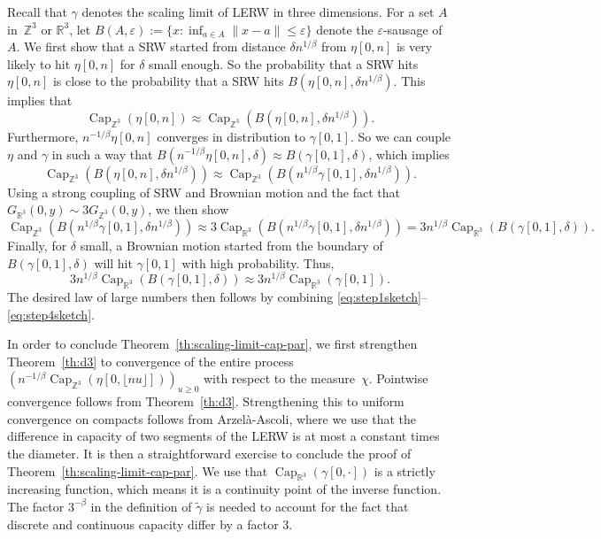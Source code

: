 \documentclass{article}
\DeclareMathOperator{\C}{Cap}
\DeclareMathOperator{\Ca}{Cap}
\newcommand{\R}{\mathbb{R}}
\newcommand{\Z}{\mathbb{Z}}
\newcommand{\1}{\mathbf{1}}
\newcommand{\Cz}{\C_{\Z^3}}
\newcommand{\Cr}{\C_{\R^3}}
\theoremstyle{definition}
\numberwithin{equation}{section}
\numberwithin{theorem}{section}
\begin{document}
Recall that $\gamma$ denotes the scaling limit of LERW in three dimensions. For a set $A$ in~$\Z^3$ or $\R^3$, let $B(A,\varepsilon):=\{x\colon\inf_{a\in A}\|x-a\|\leq\varepsilon\}$ denote the $\varepsilon$-sausage of $A$. We first show that a SRW started from distance $\delta n^{1/\beta}$ from $\eta[0,n]$ is very likely to hit $\eta[0,n]$ for $\delta$ small enough. So the probability that a SRW hits $\eta[0,n]$ is close to the probability that a SRW hits $B(\eta[0,n],\delta n^{1/\beta})$. This implies that 
\begin{equation}\label{eq:step1sketch}
	\Ca_{\Z^3}(\eta[0,n])\approx \Ca_{\Z^3}(B(\eta[0,n],\delta n^{1/\beta})).
\end{equation}
Furthermore, $n^{-1/\beta}\eta[0,n]$ converges in distribution to $\gamma[0,1]$. So we can couple $\eta$ and $\gamma$ in such a way that $B(n^{-1/\beta}\eta[0,n],\delta)\approx B(\gamma[0,1],\delta)$, which implies
\begin{equation}\label{eq:step2sketch}
	\Ca_{\Z^3}(B(\eta[0,n],\delta n^{1/\beta}))\approx\Ca_{\Z^3}(B(n^{1/\beta}\gamma[0,1],\delta n^{1/\beta})).
\end{equation}
Using a strong coupling of SRW and Brownian motion and the fact that $G_{\R^3}(0,y)\sim3G_{\Z^3}(0,y)$, we then show
\begin{equation}\label{eq:step3sketch}
	\Ca_{\Z^3}(B(n^{1/\beta}\gamma[0,1],\delta n^{1/\beta}))\approx3\Ca_{\R^3}(B(n^{1/\beta}\gamma[0,1],\delta n^{1/\beta}))=3n^{1/\beta}\Ca_{\R^3}(B(\gamma[0,1],\delta)).
\end{equation}
Finally, for $\delta$ small, a Brownian motion started from the boundary of $B(\gamma[0,1],\delta)$ will hit $\gamma[0,1]$ with high probability. Thus,
\begin{equation}\label{eq:step4sketch}
	3n^{1/\beta}\Ca_{\R^3}(B(\gamma[0,1],\delta))\approx3n^{1/\beta}\Ca_{\R^3}(\gamma[0,1]).
\end{equation}
The desired law of large numbers then follows by combining \eqref{eq:step1sketch}--\eqref{eq:step4sketch}.

In order to conclude Theorem~\ref{th:scaling-limit-cap-par}, we first strengthen Theorem~\ref{th:d3} to convergence of the entire process $(n^{-1/\beta}\Cz(\eta[0,\lfloor nu\rfloor]))_{u\geq0}$ with respect to the measure~$\chi$. Pointwise convergence follows from Theorem~\ref{th:d3}. Strengthening this to uniform convergence on compacts follows from Arzel\`a-Ascoli, where we use that the difference in capacity of two segments of the LERW is at most a constant times the diameter. It is then a straightforward exercise to conclude the proof of Theorem~\ref{th:scaling-limit-cap-par}. We use that $\Cr(\gamma[0,\cdot])$ is a strictly increasing function, which means it is a continuity point of the inverse function. The factor $3^{-\beta}$ in the definition of $\widetilde\gamma$ is needed to account for the fact that discrete and continuous capacity differ by a factor 3. 
\end{document}

